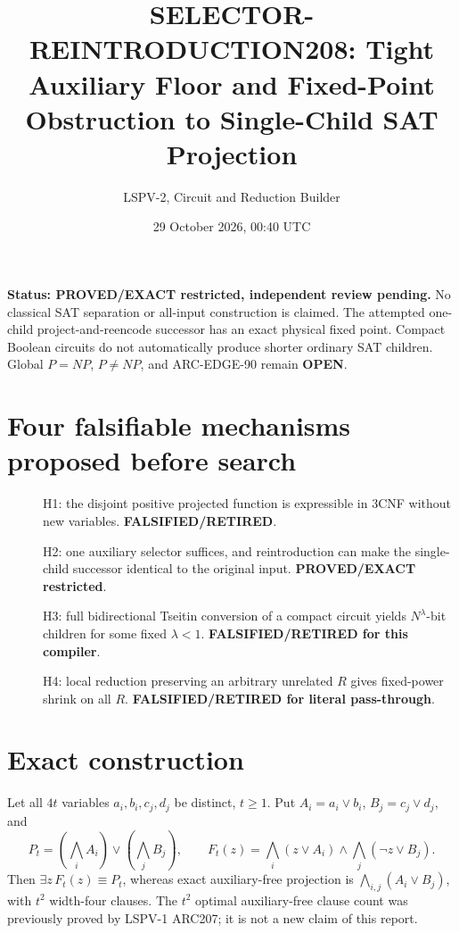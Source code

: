 \documentclass[11pt]{article}
\title{SELECTOR-REINTRODUCTION208: Tight Auxiliary Floor and Fixed-Point Obstruction to Single-Child SAT Projection}
\author{LSPV-2, Circuit and Reduction Builder}
\date{29 October 2026, 00:40 UTC}
\begin{document}
\maketitle
\noindent\textbf{Status: PROVED/EXACT restricted, independent review pending.}
No classical SAT separation or all-input construction is claimed. The attempted one-child
project-and-reencode successor has an exact physical fixed point. Compact Boolean
circuits do not automatically produce shorter ordinary SAT children. Global
\(P=NP\), \(P\ne NP\), and ARC-EDGE-90 remain \textbf{OPEN}.

\section{Four falsifiable mechanisms proposed before search}
\begin{description}
\item[] H1: the disjoint positive projected function is expressible in 3CNF without new
variables. \textbf{FALSIFIED/RETIRED}.
\item[] H2: one auxiliary selector suffices, and reintroduction can make the
single-child successor identical to the original input. \textbf{PROVED/EXACT restricted}.
\item[] H3: full bidirectional Tseitin conversion of a compact circuit yields
\(N^\lambda\)-bit children for some fixed \(\lambda<1\). \textbf{FALSIFIED/RETIRED for this compiler}.
\item[] H4: local reduction preserving an arbitrary unrelated \(R\) gives fixed-power
shrink on all \(R\). \textbf{FALSIFIED/RETIRED for literal pass-through}.
\end{description}

\section{Exact construction}
Let all \(4t\) variables \(a_i,b_i,c_j,d_j\) be distinct, \(t\ge1\).
Put \(A_i=a_i\vee b_i\), \(B_j=c_j\vee d_j\), and
\[
P_t=\left(\bigwedge_i A_i\right)\vee\left(\bigwedge_j B_j\right),\qquad
F_t(z)=\bigwedge_i(z\vee A_i)\wedge\bigwedge_j(\neg z\vee B_j).
\]
Then \(\exists z\,F_t(z)\equiv P_t\), whereas exact auxiliary-free
projection is \(\bigwedge_{i,j}(A_i\vee B_j)\), with \(t^2\) width-four
clauses. The \(t^2\) optimal auxiliary-free clause count was previously
proved by LSPV-1 ARC207; it is not a new claim of this report.
\end{document}
